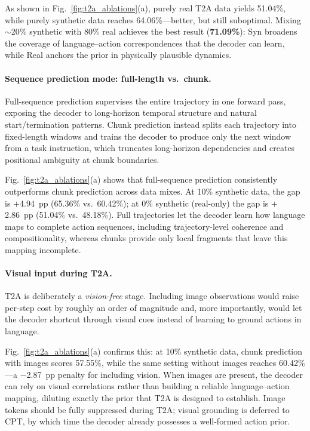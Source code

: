 As shown in Fig.~\ref{fig:t2a_ablations}(a), purely real T2A data yields
51.04\%, while purely synthetic data reaches 64.06\%---better, but still
suboptimal.
Mixing $\sim$20\% synthetic with 80\% real achieves the best result
(\textbf{71.09\%}): Syn broadens the coverage of language--action
correspondences that the decoder can learn, while Real anchors the prior
in physically plausible dynamics.

\paragraph{Sequence prediction mode: full-length vs.\ chunk.}

Full-sequence prediction supervises the entire trajectory in one forward pass,
exposing the decoder to long-horizon temporal structure and natural
start/termination patterns.
Chunk prediction instead splits each trajectory into fixed-length windows and
trains the decoder to produce only the next window from a task instruction,
which truncates long-horizon dependencies and creates positional ambiguity at
chunk boundaries.

Fig.~\ref{fig:t2a_ablations}(a) shows that full-sequence prediction
consistently outperforms chunk prediction across data mixes.
At 10\% synthetic data, the gap is $+$4.94~pp (65.36\% vs.\ 60.42\%);
at 0\% synthetic (real-only) the gap is $+$2.86~pp (51.04\% vs.\ 48.18\%).
Full trajectories let the decoder learn how language maps to complete action
sequences, including trajectory-level coherence and compositionality, whereas
chunks provide only local fragments that leave this mapping incomplete.

\paragraph{Visual input during T2A.}

T2A is deliberately a \emph{vision-free} stage.
Including image observations would raise per-step cost by roughly an order of
magnitude and, more importantly, would let the decoder shortcut through
visual cues instead of learning to ground actions in language.

Fig.~\ref{fig:t2a_ablations}(a) confirms this: at 10\% synthetic
data, chunk prediction with images scores 57.55\%, while the same setting
without images reaches 60.42\%---a $-$2.87~pp penalty for including vision.
When images are present, the decoder can rely on visual correlations
rather than building a reliable language--action mapping, diluting exactly
the prior that T2A is designed to establish.
{Image tokens should be fully suppressed during T2A}; visual grounding
is deferred to CPT, by which time the decoder already possesses a
well-formed action prior.



